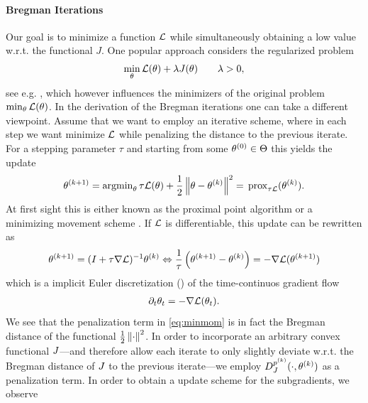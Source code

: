 \paragraph{Bregman Iterations} Our goal is to minimize a function $\mathcal{L}$ while simultaneously obtaining a low value w.r.t. the functional $J$. One popular approach considers the regularized problem
%
\begin{align*}
	\min_\theta \mathcal{L}(\theta) + \lambda J(\theta)\qquad \lambda>0,
\end{align*}
%
see e.g. \cite{tikhonov1943stability, combettes2008proximal,daubechies2004iterative,fadili2006sparse,figueiredo2007gradient,chambolle2004algorithm,chambolle2011first}, which however influences the minimizers of the original problem $\min_\theta \mathcal{L}(\theta)$. In the derivation of the Bregman iterations one can take a different viewpoint. Assume that we want to employ an iterative scheme, where in each step we want minimize $\mathcal{L}$ while penalizing the distance to the previous iterate. For a stepping parameter $\tau$ and starting from some $\theta^{(0)}\in\Theta$ this yields the update
%
\begin{align}\label{eq:minmom}
	\theta^{(k+1)} = \operatorname{argmin}_\theta \tau\mathcal{L}(\theta) + \frac{1}{2}\left\|\theta -\theta^{(k)}\right\|^2 
	= \,\mathrm{prox}_{\tau\mathcal{L}}(\theta^{(k)}).
\end{align}
%
At first sight this is either known as the proximal point algorithm \cite{bregman1967relaxation} or a minimizing movement scheme \cite{de1993new}. If $\mathcal{L}$ is differentiable, this update can be rewritten as 
%
\begin{align*}
	\theta^{(k+1)} = (I+\tau\nabla\mathcal{L})^{-1}\theta^{(k)}
	\Leftrightarrow
	\frac{1}{\tau}\left(\theta^{(k+1)} - \theta^{(k)}\right)
	= -\nabla\mathcal{L}(\theta^{(k+1)})
\end{align*}
%
which is a implicit Euler discretization (\cite{euler1824institutionum}) of the time-continuos gradient flow
%
\begin{align*}
	\partial_t \theta_t = -\nabla\mathcal{L}(\theta_t).
\end{align*}
%
%
We see that the penalization term in \cref{eq:minmom} is in fact the Bregman distance of the functional $\frac{1}{2}\left\|\cdot\right\|^2$. In order to incorporate an arbitrary convex functional $J$---and therefore allow each iterate to only slightly deviate w.r.t. the Bregman distance of $J$ to the previous iterate---we employ $D_J^{p^{(k)}}(\cdot, \theta^{(k)})$ as a penalization term. In order to obtain a update scheme for the subgradients, we observe
